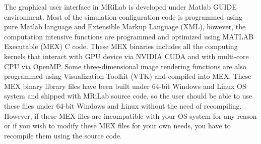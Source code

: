 \documentclass{book}%
\begin{document}
The graphical user interface in MRiLab is developed under Matlab GUIDE environment. Most of the simulation configuration code is programmed using pure Matlab language and Extensible Markup Language (XML), however, the computation intensive functions are programmed and optimized using MATLAB Executable (MEX) C code. These MEX binaries includes all the computing kernels that interact with GPU device via NVIDIA CUDA and with multi-core CPU via OpenMP. Some three-dimensional image rendering functions are also programmed using Visualization Toolkit (VTK) and compiled into MEX. These MEX binary library files have been built under 64-bit Windows and Linux OS system and shipped with MRiLab source code, so the user should be able to use these files under 64-bit Windows and Linux without the need of recompiling. However, if these MEX files are incompatible with your OS system for any reason or if you wish to modify these MEX files for your own needs, you have to recompile them using the source code. \\
\end{document}

